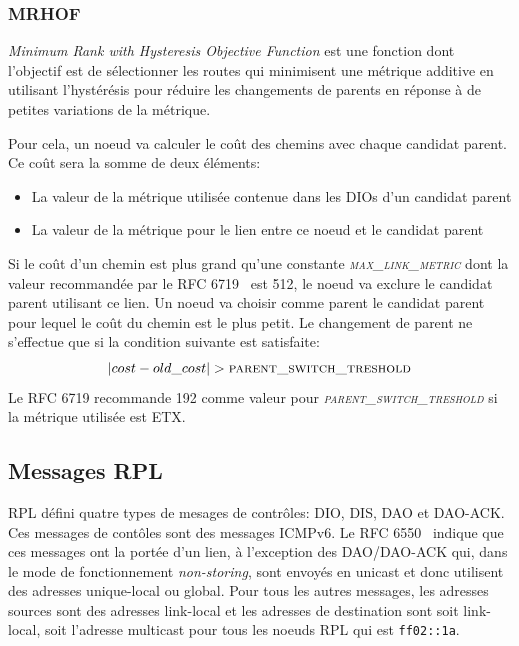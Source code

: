     \subsubsection*{MRHOF}%
            \textit{Minimum Rank with Hysteresis Objective Function} est une fonction dont l'objectif est de sélectionner les routes qui minimisent une métrique additive en utilisant l'hystérésis
            pour réduire les changements de parents en réponse à de petites variations de la métrique.
            
            Pour cela, un noeud va calculer le coût des chemins avec chaque candidat parent. Ce coût sera la somme de deux éléments:
            \begin{itemize}
                \item La valeur de la métrique utilisée contenue dans les DIOs d'un candidat parent
                \item La valeur de la métrique pour le lien entre ce noeud et le candidat parent
            \end{itemize}
            Si le coût d'un chemin est plus grand qu'une constante \textsl{\textsc{max\_link\_metric}} dont la valeur recommandée par le RFC 6719~\cite{rfc:mrhof} est 512,
            le noeud va exclure le candidat parent utilisant ce lien.
            Un noeud va choisir comme parent le candidat parent pour lequel le coût du chemin est le plus petit. Le changement de parent ne s'effectue que si la condition suivante est satisfaite:
            \[ |cost-old\_cost| > \textsc{parent\_switch\_treshold} \]
            Le RFC 6719 recommande 192 comme valeur pour \textsl{\textsc{parent\_switch\_treshold}} si la métrique utilisée est ETX.

\subsection*{Messages RPL}
    RPL défini quatre types de mesages de contrôles: DIO, DIS, DAO et DAO-ACK. Ces messages de contôles sont des messages ICMPv6. Le RFC 6550~\cite{rfc:rpl} indique que ces messages ont la portée d'un lien, à l'exception des DAO/DAO-ACK qui, dans le mode de fonctionnement \textit{non-storing}, sont envoyés en unicast et donc utilisent des adresses unique-local ou global. Pour tous les autres messages, les adresses sources sont des adresses link-local et les adresses de destination sont soit link-local, soit l'adresse multicast pour tous les noeuds RPL qui est \texttt{ff02::1a}.

